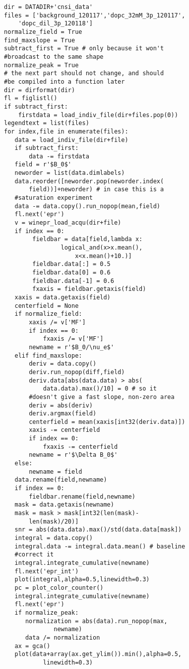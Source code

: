 {\begin{tiny}
\begin{lstlisting}
dir = DATADIR+'cnsi_data'
files = ['background_120117','dopc_32mM_3p_120117',
    'dopc_dil_3p_120118']
normalize_field = True
find_maxslope = True
subtract_first = True # only because it won't
#broadcast to the same shape
normalize_peak = True
# the next part should not change, and should
#be compiled into a function later
dir = dirformat(dir)
fl = figlistl()
if subtract_first:
    firstdata = load_indiv_file(dir+files.pop(0))
legendtext = list(files)
for index,file in enumerate(files):
   data = load_indiv_file(dir+file)
   if subtract_first:
       data -= firstdata
   field = r'$B_0$'
   neworder = list(data.dimlabels)
   data.reorder([neworder.pop(neworder.index(
       field))]+neworder) # in case this is a
   #saturation experiment
   data -= data.copy().run_nopop(mean,field)
   fl.next('epr')
   v = winepr_load_acqu(dir+file)
   if index == 0:
        fieldbar = data[field,lambda x:
                logical_and(x>x.mean(),
                    x<x.mean()+10.)]
        fieldbar.data[:] = 0.5
        fieldbar.data[0] = 0.6
        fieldbar.data[-1] = 0.6
        fxaxis = fieldbar.getaxis(field)
   xaxis = data.getaxis(field)
   centerfield = None
   if normalize_field:
       xaxis /= v['MF']
       if index == 0:
           fxaxis /= v['MF']
       newname = r'$B_0/\nu_e$'
   elif find_maxslope:
       deriv = data.copy()
       deriv.run_nopop(diff,field)
       deriv.data[abs(data.data) > abs(
           data.data).max()/10] = 0 # so it
       #doesn't give a fast slope, non-zero area
       deriv = abs(deriv)
       deriv.argmax(field)
       centerfield = mean(xaxis[int32(deriv.data)])
       xaxis -= centerfield
       if index == 0:
           fxaxis -= centerfield
       newname = r'$\Delta B_0$'
   else:
       newname = field
   data.rename(field,newname)
   if index == 0:
       fieldbar.rename(field,newname)
   mask = data.getaxis(newname)
   mask = mask > mask[int32(len(mask)-
       len(mask)/20)]
   snr = abs(data.data).max()/std(data.data[mask])
   integral = data.copy()
   integral.data -= integral.data.mean() # baseline
   #correct it
   integral.integrate_cumulative(newname)
   fl.next('epr_int')
   plot(integral,alpha=0.5,linewidth=0.3)
   pc = plot_color_counter()
   integral.integrate_cumulative(newname)
   fl.next('epr')
   if normalize_peak:
      normalization = abs(data).run_nopop(max,
              newname)
      data /= normalization
   ax = gca()
   plot(data+array(ax.get_ylim()).min(),alpha=0.5,
           linewidth=0.3)

\end{lstlisting}
\end{tiny}}
